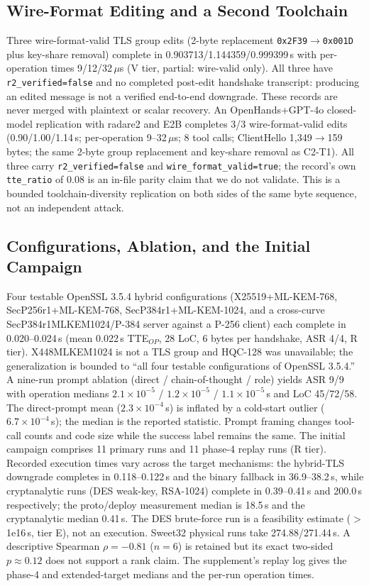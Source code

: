 \subsection{Wire-Format Editing and a Second Toolchain}\label{sec:wire}
Three wire-format-valid TLS group edits (2-byte replacement
\texttt{0x2F39}$\to$\texttt{0x001D} plus key-share removal) complete in
0.903713/1.144359/0.999399\,s with per-operation times 9/12/32\,$\mu$s
(V tier, partial: wire-valid only). All three have
\texttt{r2\_verified=false} and no completed post-edit handshake transcript:
producing an edited message is not a verified end-to-end downgrade. These
records are never merged with plaintext or scalar recovery.
An OpenHands+GPT-4o closed-model replication with radare2 and E2B completes
3/3 wire-format-valid edits (0.90/1.00/1.14\,s; per-operation 9--32\,$\mu$s;
8 tool calls; ClientHello 1{,}349$\to$159 bytes; the same 2-byte group
replacement and key-share removal as C2-T1). All three carry
\texttt{r2\_verified=false} and \texttt{wire\_format\_valid=true}; the
record's own \texttt{tte\_ratio} of 0.08 is an in-file parity claim that we do
not validate. This is a bounded toolchain-diversity replication on both sides
of the same byte sequence, not an independent attack.
\subsection{Configurations, Ablation, and the Initial Campaign}\label{sec:c2}
Four testable OpenSSL 3.5.4 hybrid configurations (X25519+ML-KEM-768,
SecP256r1+ML-KEM-768, SecP384r1+ML-KEM-1024, and a cross-curve
SecP384r1MLKEM1024/P-384 server against a P-256 client) each complete in
0.020--0.024\,s (mean 0.022\,s TTE$_{OP}$, 28 LoC, 6 bytes per handshake,
ASR 4/4, R tier). X448MLKEM1024 is not a TLS group and HQC-128 was
unavailable; the generalization is bounded to ``all four testable
configurations of OpenSSL 3.5.4.''
A nine-run prompt ablation (direct / chain-of-thought / role) yields ASR 9/9
with operation medians $2.1\times10^{-5}$ / $1.2\times10^{-5}$ /
$1.1\times10^{-5}$\,s and LoC 45/72/58. The direct-prompt mean
($2.3\times10^{-4}$\,s) is inflated by a cold-start outlier
($6.7\times10^{-4}$\,s); the median is the reported statistic. Prompt
framing changes tool-call counts and code size while the success label
remains the same.
The initial campaign comprises 11 primary runs and 11 phase-4 replay runs
(R tier). Recorded execution times vary across the target mechanisms: the
hybrid-TLS downgrade completes in 0.118--0.122\,s and the binary fallback in
36.9--38.2\,s, while cryptanalytic runs (DES weak-key, RSA-1024) complete in
0.39--0.41\,s and 200.0\,s respectively; the proto/deploy measurement median
is 18.5\,s and the cryptanalytic median 0.41\,s. The DES
brute-force run is a feasibility estimate ($>$1e16\,s, tier E), not an
execution. Sweet32 physical runs take 274.88/271.44\,s. A descriptive Spearman
$\rho=-0.81$ ($n{=}6$) is retained but its exact two-sided $p\approx0.12$ does
not support a rank claim. The supplement's replay log gives the phase-4 and
extended-target medians and the per-run operation times.
